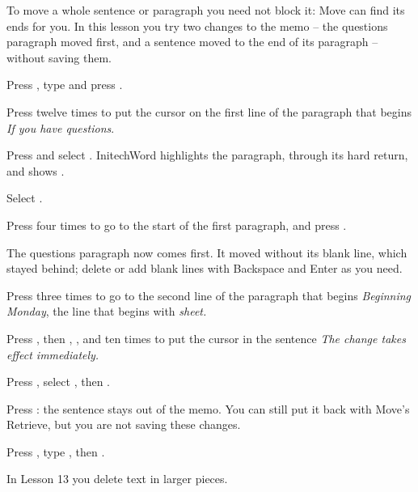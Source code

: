 To move a whole sentence or paragraph you need not block it: Move can find
its ends for you.  In this lesson you try two changes to the memo -- the
questions paragraph moved first, and a sentence moved to the end of its
paragraph -- without saving them.

\begin{WPSteps}
\item Press , type  and press
.
\item Press  twelve times to put the cursor on the first line
of the paragraph that begins \textit{If you have
questions}.
\item Press  and select .
InitechWord highlights the paragraph, through its hard return, and shows
.
\end{WPSteps}
\begin{WPSteps}[resume]
\item Select .
\item Press  four times to go to the start of the
first paragraph, and press .
\end{WPSteps}
The questions paragraph now comes first.  It moved without its blank line,
which stayed behind; delete or add blank lines with Backspace and Enter as
you need.

\begin{WPSteps}
\item Press  three times to go to the second
line of the paragraph that begins \textit{Beginning Monday}, the line that
begins with \textit{sheet.}
\item Press , then , , and
 ten times to put the cursor in the sentence \textit{The
change takes effect immediately.}
\item Press , select , then
.
\end{WPSteps}

\begin{WPSteps}
\item Press : the sentence stays out of the memo.  You can
still put it back with Move's Retrieve, but you are not saving these changes.
\item Press , type , then .
\end{WPSteps}
\EndReplay
In Lesson 13 you delete text in larger pieces.
